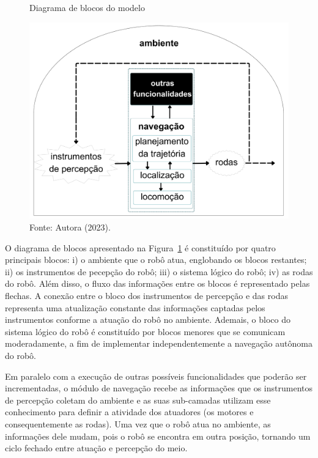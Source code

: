 \begin{figure}[h]
    \centering
    \caption{Diagrama de blocos do modelo}
    \includegraphics[scale=0.08]{blocos.png}
   
    \caption*{Fonte: Autora (2023).}
    \label{fig:blocos}
\end{figure}

\newpage

O diagrama de blocos apresentado na Figura~\ref{fig:blocos} é constituído por quatro principais blocos: i) o ambiente que o robô atua, englobando os blocos restantes; ii) os instrumentos de pecepção do robô; iii) o sistema lógico do robô; iv) as rodas do robô. Além disso, o fluxo das informações entre os blocos é representado pelas flechas. A conexão entre o bloco dos instrumentos de percepção e das rodas representa uma atualização constante das informações captadas pelos instrumentos conforme a atuação do robô no ambiente. Ademais, o bloco do sistema lógico do robô é constituído por blocos menores que se comunicam moderadamente, a fim de implementar independentemente a navegação autônoma do robô. 

Em paralelo com a execução de outras possíveis funcionalidades que poderão ser incrementadas, o módulo de navegação recebe as informações que os instrumentos de percepção coletam do ambiente e as suas sub-camadas utilizam esse conhecimento para definir a atividade dos atuadores (os motores e consequentemente as rodas). Uma vez que o robô atua no ambiente, as informações dele mudam, pois o robô se encontra em outra posição, tornando um ciclo fechado entre atuação e percepção do meio.

